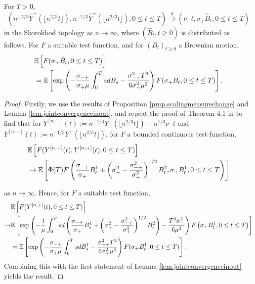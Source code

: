 \begin{theorem}\label{theorem.convaftermeasurechange} 
 For $T>0$,
$$\left(n^{-2/3}\hat{Y}^-\left(\lfloor n^{2/3} t\rfloor\right), n^{-1/3}\hat{Y}^+\left(\lfloor  n^{2/3} t\rfloor\right), 0\leq t \leq T \right) \overset{d}{\to} \left( \nu_- t, \sigma_+\hat{B}_t, 0 \leq t \leq T \right)$$
in the Skorokhod topology as $n\to \infty$, where $(\hat{B}_t, t\geq 0)$ is distributed as follows.
For $F$ a suitable test function, and for $(B_t)_{t\geq 0}$ a Brownian motion,
\begin{align*} &{\mathbb E}\left[F(\sigma_+ \hat{B}_t,0\leq t \leq T)\right]\\&={\mathbb E}\left[\exp\left(-\frac{\sigma_{-+}}{\sigma_+ \mu} \int_0^T s dB_s -\frac{\sigma_{-+}^2 T^3}{6\sigma_+^2 \mu^2}\right)F(\sigma_+ B_t,   0\leq t \leq T)\right].\end{align*}

\end{theorem}
\begin{proof}
 Firstly, we use the results of Proposition \ref{prop.scalingmeasurechange}  and Lemma \ref{lem.jointconvergenceinout}, and repeat the proof of Theorem 4.1 in \cite{Conchon2018} to find that for ${Y}^{[n,-]}(t):=n^{-1/3}{Y}^-\left(\lfloor n^{2/3}t\rfloor\right)-n^{1/3}\nu_-t $ and ${Y}^{[n,+]}(t):=n^{-1/3}{Y}^+\left(\lfloor n^{2/3}t\rfloor\right)$, for $F$ a bounded continuous test-function,
 \begin{align*}&{\mathbb E}\left[F({Y}^{[n,-]}(t),{Y}^{[n,+]}(t), 0\leq t \leq T ) \right] 
 \\&\to {\mathbb E}\left[\Phi(T) F\left(\frac{\sigma_{-+}}{\sigma_+}B_t^1+\left(\sigma_-^2-\frac{\sigma_{-+}^2}{\sigma_+^2}\right)^{1/2}B_t^2   ,\sigma_+ B_t^1, 0\leq t \leq T\right)\right]\\
 \end{align*}
 
 as $n\to \infty$. Hence, for $F$ a suitable test function, 
 \begin{align*}&\E\left[F({Y}^{[n,+]}(t), 0\leq t \leq T ) \right]\\\to& \E\left[\exp\left(-\frac{1}{\mu}\int_0^Tsd\left(\frac{\sigma_{-+}}{\sigma_+}B_s^1+\left(\sigma_-^2-\frac{\sigma_{-+}^2}{\sigma_+^2}\right)^{1/2}B_s^2\right) - \frac{T^3 \sigma_-^2}{6\mu^2}\right) F\left(\sigma_+ B_t^1, 0\leq t \leq T\right)\right]\\
 &=\E\left[\exp\left(-\frac{\sigma_{-+}}{\sigma_+ \mu} \int_0^T s dB^1_s -\frac{\sigma_{-+}^2 T^3}{6\sigma_+^2 \mu^2}\right)F(\sigma_+ B^1_t,   0\leq t \leq T)\right].\end{align*}
 Combining this with the first statement of Lemma \ref{lem.jointconvergenceinout} yields the result.
 \end{proof}
